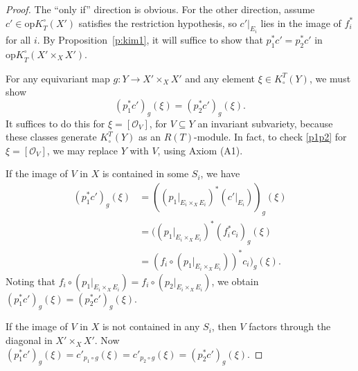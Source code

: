 \documentclass[11pt]{amsart}
\theoremstyle{definition}
\begin{document}
\begin{proof}
The ``only if'' direction is obvious.  For the other direction, assume $c'\in {\mathrm{op}K}_T^\circ(X')$ satisfies the restriction hypothesis, so $c'|_{E_i}$ lies in the image of $f_i^*$ for all $i$.  By Proposition~\ref{p:kim1}, it will suffice to show that $p_1^*c'=p_2^*c'$ in ${\mathrm{op}K}_T^\circ(X' \times_X X')$.

For any equivariant map $g\colon Y \to X'\times_X X'$ and any element $\xi \in K^T_\circ(Y)$, we must show
\begin{equation}\label{p1p2}
  (p_1^*c')_g(\xi) = (p_2^*c')_g(\xi).
\end{equation}
It suffices to do this for $\xi = [{\mathcal{O}}_V]$, for $V\subseteq Y$ an invariant subvariety, because these classes generate $K^T_\circ(Y)$ as an $R(T)$-module.  In fact, to check \eqref{p1p2} for $\xi=[{\mathcal{O}}_V]$, we may replace $Y$ with $V$, using Axiom (A1).

If the image of $V$ in $X$ is contained in some $S_i$, we have
\begin{align*}
  (p_1^*c')_g(\xi) &= ((p_1|_{E_i\times_X E_i})^*(c'|_{E_i}))_g(\xi) \\
                       &= ((p_1|_{E_i\times_X E_i})^*(f_i^*c_i)_g(\xi) \\
                       &= (f_i\circ(p_1|_{E_i\times_X E_i}))^*c_i)_g(\xi).
\end{align*}
Noting that $f_i\circ(p_1|_{E_i\times_X E_i}) = f_i\circ(p_2|_{E_i\times_X E_i})$, we obtain $(p_1^*c')_g(\xi)=(p_2^*c')_g(\xi)$.

If the image of $V$ in $X$ is not contained in any $S_i$, then $V$ factors through the diagonal in $X' \times_X X'$.  Now $(p_1^*c')_g(\xi) = c'_{p_1\circ g}(\xi) = c'_{p_2\circ g}(\xi) = (p_2^*c')_g(\xi)$.
\end{proof}
\end{document}
